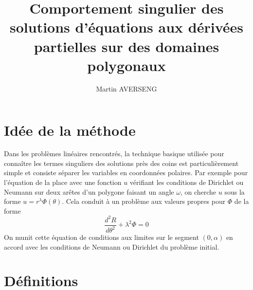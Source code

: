 \documentclass[11pt,a4paper]{article}
\author{Martin AVERSENG}
\title{Comportement singulier des solutions d'équations aux dérivées partielles sur des domaines polygonaux}
\begin{document}
\maketitle	

\section{Idée de la méthode}
Dans les problèmes linéaires rencontrés, la technique basique utilisée pour connaître les termes singuliers des solutions près des coins est particulièrement simple et consiste séparer les variables en coordonnées polaires. Par exemple pour l'équation de la place avec une fonction $u$ vérifiant les conditions de Dirichlet ou Neumann sur deux arêtes d'un polygone faisant un angle $\omega$, on cherche $u$ sous la forme $u = r^\lambda\Phi(\theta)$. Cela conduit à un problème aux valeurs propres pour $\Phi$ de la forme
\[ \dfrac{d^2 R}{d \theta^2}  + \lambda^2 \Phi = 0\]
On munit cette équation de conditions aux limites sur le segment $(0,\alpha)$ en accord avec les conditions de Neumann ou Dirichlet du problème initial. 

\section{Définitions}
\end{document}
